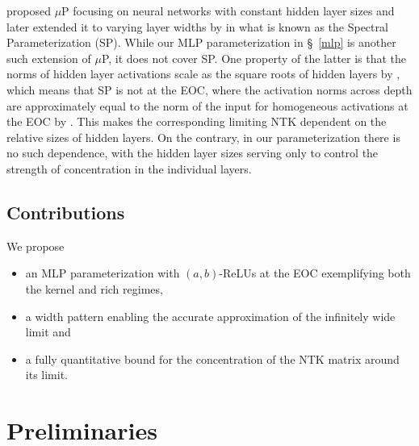 \documentclass[twoside,11pt]{article}
\begin{document}
\citet{Yangetal2021} proposed $\mu$P focusing on neural networks with constant hidden layer sizes and later extended it to varying layer widths by \citet{Yangetal2023} in what is known as the Spectral Parameterization (SP). While our MLP parameterization in \S~\ref{mlp} is another such extension of $\mu$P, it does not cover SP. One property of the latter is that the norms of hidden layer activations scale as the square roots of hidden layers by \citet[Desideratum~1]{Yangetal2023}, which means that SP is not at the EOC, where the activation norms across depth are approximately equal to the norm of the input for homogeneous activations at the EOC by \citet[\S~3.1]{Hayouetal2019}. This makes the corresponding limiting NTK dependent on the relative sizes of hidden layers. On the contrary, in our parameterization there is no such dependence, with the hidden layer sizes serving only to control the strength of concentration in the individual layers.

\subsection{Contributions} \label{contributions}
We propose
\begin{itemize}
\item an MLP parameterization with $(a,b)$-ReLUs at the EOC exemplifying both the kernel and rich regimes,
\item a width pattern enabling the accurate approximation of the infinitely wide limit and
\item a fully quantitative bound for the concentration of the NTK matrix around its limit.
\end{itemize}

\section{Preliminaries}\label{preliminaries}
\end{document}
